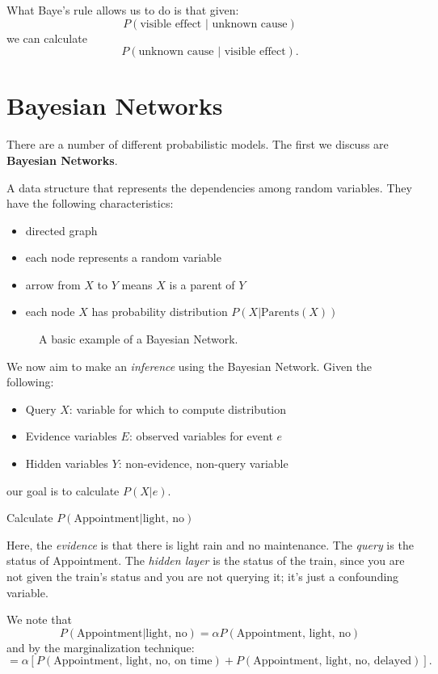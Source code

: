 What Baye's rule allows us to do is that given:
\[
	P(\text{visible effect }|\text{ unknown cause})
\]
we can calculate
\[
	P(\text{unknown cause }|\text{ visible effect}).
\]

\section{Bayesian Networks}
There are a number of different probabilistic models. The first we discuss are \textbf{Bayesian Networks}.

\begin{definition}
	A data structure that represents the dependencies among random variables. They have the following characteristics:
	\begin{itemize}
		\item directed graph
		\item each node represents a random variable
		\item arrow from \(X\) to \(Y\) means \(X\) is a parent of \(Y\)
		\item each node \(X\) has probability distribution \(P(X | \text{Parents}(X))\) 
	\end{itemize}
\end{definition}

\begin{figure}[H]
	\centering
	\caption{A basic example of a Bayesian Network.}
	\label{fig:bayeneteg}
\end{figure}

We now aim to make an \emph{inference} using the Bayesian Network. Given the following:
\begin{itemize}
	\item Query \(X\): variable for which to compute distribution
	\item Evidence variables \(E\): observed variables for event \(e\)
	\item Hidden variables \(Y\): non-evidence, non-query variable
\end{itemize}
our goal is to calculate \(P(X|e)\).

\begin{problem}
	Calculate \(P(\text{Appointment} | \text{light, no} )\) 
\end{problem}
\begin{answer}
	Here, the \emph{evidence} is that there is light rain and no maintenance. The \emph{query} is the status of Appointment. The \emph{hidden layer} is the status of the train, since you are not given the train's status and you are not querying it; it's just a confounding variable. \par

	We note that
	\[
		P(\text{Appointment} | \text{light, no} ) = \alpha P(\text{Appointment, light, no} )
	\]
	and by the marginalization technique:
	\[
		=\alpha [P(\text{Appointment, light, no, on time}) + P(\text{Appointment, light, no, delayed} )].
	\]
\end{answer}

